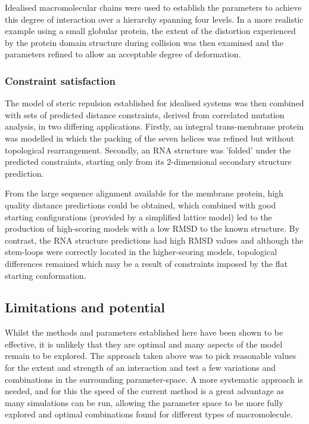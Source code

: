 \documentclass[review]{elsarticle}
\begin{document}
{{{{{Idealised macromolecular chains were used to establish the parameters
to achieve this degree of interaction over a hierarchy spanning four levels.
In a more realistic example using a small globular protein, the extent of the 
distortion experienced by the protein domain structure during collision was then 
examined and the parameters refined to allow an acceptable degree of deformation.

\subsubsection{Constraint satisfaction}

The model of steric repulsion established for idealised systems was then
combined with sets of predicted distance constraints, derived from correlated
mutation analysis,  in two differing applications.    Firstly, an integral
trans-membrane protein was modelled in which the packing of the seven
helices was refined but without topological rearrangement.  Secondly,
an RNA structure was 'folded' under the predicted constraints, starting only
from its 2-dimensional secondary structure prediction.

From the large sequence alignment available for the membrane protein, high
quality distance predictions could be obtained, which combined with good
starting configurations (provided by a simplified lattice model) led to 
the production of high-scoring models with a low RMSD to the known structure.
By contrast, the RNA structure predictions had high RMSD values and although
the stem-loops were correctly located in the higher-scoring models, topological
differences remained which may be a result of constraints imposed by the
flat starting conformation.

\subsection{Limitations and potential}

Whilst the methods and parameters established here have been shown to be
effective, it is unlikely that they are optimal and many aspects of the
model remain to be explored.    The approach taken above was to pick
reasonable values for the extent and strength of an interaction and test
a few variations and combinations in the surrounding parameter-space.
A more systematic approach is needed, and for this the speed of the current
method is a great advantage as many simulations can be run, allowing the
parameter space to be more fully explored and optimal combinations found
for different types of macromolecule.

}}}}}
\end{document}
